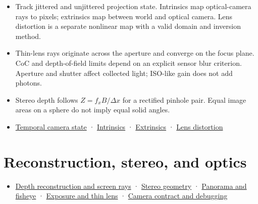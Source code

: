 \begin{itemize}
\tightlist
\item
  Track jittered and unjittered projection state. Intrinsics map optical-camera rays to pixels; extrinsics map between world and optical camera. Lens distortion is a separate nonlinear map with a valid domain and inversion method.
\item
  Thin-lens rays originate across the aperture and converge on the focus plane. CoC and depth-of-field limits depend on an explicit sensor blur criterion. Aperture and shutter affect collected light; ISO-like gain does not add photons.
\item
  Stereo depth follows \(Z=f_xB/\Delta x\) for a rectified pinhole pair. Equal image areas on a sphere do not imply equal solid angles.
\item
  \href{Continuous\%20Notes/Computing\%20Foundations\%20-\%20From\%20Bits\%20to\%20C++\%20and\%20Systems\%20APIs\#A\%20camera\%20image\%20changes\%20over\%20time}{Temporal camera state} · \href{Continuous\%20Notes/Computing\%20Foundations\%20-\%20From\%20Bits\%20to\%20C++\%20and\%20Systems\%20APIs\#Intrinsics\%20map\%20optical\%20rays\%20to\%20pixels}{Intrinsics} · \href{Continuous\%20Notes/Computing\%20Foundations\%20-\%20From\%20Bits\%20to\%20C++\%20and\%20Systems\%20APIs\#Extrinsics\%20place\%20the\%20optical\%20camera\%20in\%20the\%20world}{Extrinsics} · \href{Continuous\%20Notes/Computing\%20Foundations\%20-\%20From\%20Bits\%20to\%20C++\%20and\%20Systems\%20APIs\#Real\%20lenses\%20bend\%20the\%20pinhole\%20image}{Lens distortion}
\end{itemize}

\section{Reconstruction, stereo, and optics}\label{appendix-a2b71a18f5a2-reconstruction-stereo-and-optics}

\begin{itemize}
\tightlist
\item
  \href{Continuous\%20Notes/Computing\%20Foundations\%20-\%20From\%20Bits\%20to\%20C++\%20and\%20Systems\%20APIs\#Recover\%20geometry\%20from\%20depth\%20and\%20construct\%20screen-space\%20rays}{Depth reconstruction and screen rays} · \href{Continuous\%20Notes/Computing\%20Foundations\%20-\%20From\%20Bits\%20to\%20C++\%20and\%20Systems\%20APIs\#Build\%20projection\%20and\%20stereo\%20geometry\%20around\%20real\%20camera\%20baselines}{Stereo geometry} · \href{Continuous\%20Notes/Computing\%20Foundations\%20-\%20From\%20Bits\%20to\%20C++\%20and\%20Systems\%20APIs\#Represent\%20directions\%20over\%20the\%20full\%20sphere}{Panorama and fisheye} · \href{Continuous\%20Notes/Computing\%20Foundations\%20-\%20From\%20Bits\%20to\%20C++\%20and\%20Systems\%20APIs\#Model\%20exposure,\%20physical\%20optics,\%20and\%20depth\%20of\%20field}{Exposure and thin lens} · \href{Continuous\%20Notes/Computing\%20Foundations\%20-\%20From\%20Bits\%20to\%20C++\%20and\%20Systems\%20APIs\#Make\%20camera\%20conventions\%20explicit\%20and\%20debug\%20the\%20full\%20transform\%20chain}{Camera contract and debugging}
\end{itemize}

